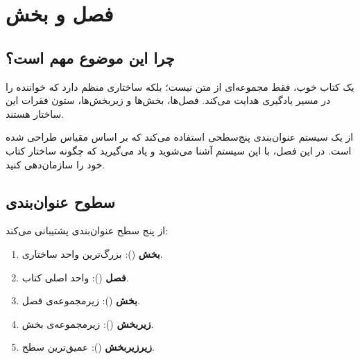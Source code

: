 
\chapter{فصل و بخش}
\label{chap:chapters}

\section{چرا این موضوع مهم است؟}
\label{sec:chapters-why}

یک کتاب خوب، فقط مجموعه‌ای از متن نیست؛ بلکه
ساختاری منظم دارد که خواننده را در مسیر یادگیری
هدایت می‌کند. فصل‌ها، بخش‌ها و زیربخش‌ها،
ستون فقرات این ساختار هستند.

 از یک سیستم عنوان‌بندی پنج‌سطحی
استفاده می‌کند که بر اساس مقیاس 
طراحی شده است. در این فصل، با این سیستم آشنا
می‌شوید و یاد می‌گیرید که چگونه ساختار کتاب
خود را سازمان‌دهی کنید.


\section{سطوح عنوان‌بندی}
\label{sec:chapters-levels}

 از پنج سطح عنوان‌بندی پشتیبانی
می‌کند:

\begin{enumerate}
    \item \textbf{بخش} (): بزرگ‌ترین
    واحد ساختاری.
    \item \textbf{فصل} (): واحد
    اصلی کتاب.
    \item \textbf{بخش} (): زیرمجموعه‌ی
    فصل.
    \item \textbf{زیربخش} ():
    زیرمجموعه‌ی بخش.
    \item \textbf{زیرزیربخش} ():
    عمیق‌ترین سطح.
\end{enumerate}


